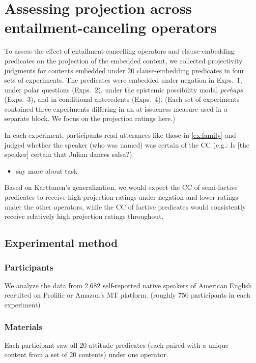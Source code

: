 \documentclass[a4paper,12pt,twoside]{article}
\begin{document}
\section{Assessing projection across entailment-canceling operators}

	To assess the effect of entailment-cancelling operators and clause-embedding predicates on the projection of the embedded content, we collected projectivity judgments for contents embedded under 20 clause-embedding predicates in four sets of experiments. The predicates were embedded under negation in Exps.~1, under polar questions (Exps.~2), under the epistemic possibility modal {\em perhaps} (Exps.~3), and in conditional antecedents (Exps.~4). (Each set of experiments contained three experiments differing in an at-issueness measure used in a separate block. We focus on the projection ratings here.)

		In each experiment, participants read utterances like those in \ref{ex:family} and judged whether the speaker (who was named) was certain of the CC (e.g.: Is [the speaker] certain that Julian dances salsa?).

		\begin{itemize}
			\item say more about task
		\end{itemize}

		Based on Karttunen's generalization, we would expect the CC of semi-factive predicates to receive high projection ratings under negation and lower ratings under the other operators, while the CC of factive predicates would consistently receive relatively high projection ratings throughout.


	\subsection{Experimental method}

		\subsubsection{Participants}
			We analyze the data from 2,682 self-reported native speakers of American English recruited on Prolific or Amazon's MT platform. (roughly 750 participants in each experiment)

		\subsubsection{Materials}
			Each participant saw all 20 attitude predicates (each paired with a unique content from a set of 20 contents) under one operator.
\end{document}
